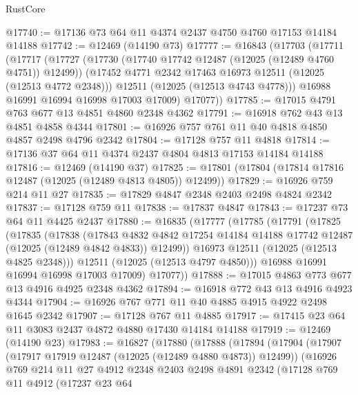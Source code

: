 \begin{lexlean}{RustCore}
\begin{coremodule}
@17740 := @17136 @73 @64 @11 @4374 @2437 @4750 @4760 @17153 @14184 @14188
@17742 := @12469 (@14190 @73)
@17777 := @16843
    (@17703
      (@17711
        (@17717
          (@17727
            (@17730 (@17740 @17742 @12487 (@12025 (@12489 @4760 @4751)) @12499))
            (@17452 @4771 @2342 @17463 @16973 @12511 (@12025 (@12513 @4772 @2348)))
            @12511
            (@12025 (@12513 @4743 @4778)))
          @16988
          @16991
          @16994
          @16998
          @17003
          @17009)
        @17077))
@17785 := @17015 @4791 @763 @677 @13 @4851 @4860 @2348 @4362
@17791 := @16918 @762 @43 @13 @4851 @4858 @4344
@17801 := @16926 @757 @761 @11 @40 @4818 @4850 @4857 @2498 @4796 @2342
@17804 := @17128 @757 @11 @4818
@17814 := @17136 @37 @64 @11 @4374 @2437 @4804 @4813 @17153 @14184 @14188
@17816 := @12469 (@14190 @37)
@17825 := @17801 (@17804 (@17814 @17816 @12487 (@12025 (@12489 @4813 @4805)) @12499))
@17829 := @16926 @759 @214 @11 @27
@17835 := @17829 @4847 @2348 @2403 @2498 @4824 @2342
@17837 := @17128 @759 @11
@17838 := @17837 @4847
@17843 := @17237 @73 @64 @11 @4425 @2437
@17880 := @16835
    (@17777
      (@17785
        (@17791
          (@17825
            (@17835
              (@17838
                (@17843
                  @4832
                  @4842
                  @17254
                  @14184
                  @14188
                  @17742
                  @12487
                  (@12025 (@12489 @4842 @4833))
                  @12499))
              @16973
              @12511
              (@12025 (@12513 @4825 @2348)))
            @12511
            (@12025 (@12513 @4797 @4850)))
          @16988
          @16991
          @16994
          @16998
          @17003
          @17009)
        @17077))
@17888 := @17015 @4863 @773 @677 @13 @4916 @4925 @2348 @4362
@17894 := @16918 @772 @43 @13 @4916 @4923 @4344
@17904 := @16926 @767 @771 @11 @40 @4885 @4915 @4922 @2498 @1645 @2342
@17907 := @17128 @767 @11 @4885
@17917 := @17415 @23 @64 @11 @3083 @2437 @4872 @4880 @17430 @14184 @14188
@17919 := @12469 (@14190 @23)
@17983 := @16827
    (@17880
      (@17888
        (@17894
          (@17904
            (@17907 (@17917 @17919 @12487 (@12025 (@12489 @4880 @4873)) @12499))
            (@16926
              @769
              @214
              @11
              @27
              @4912
              @2348
              @2403
              @2498
              @4891
              @2342
              (@17128
                @769
                @11
                @4912
                (@17237
                  @23
                  @64

\end{coremodule}
\end{lexlean}
